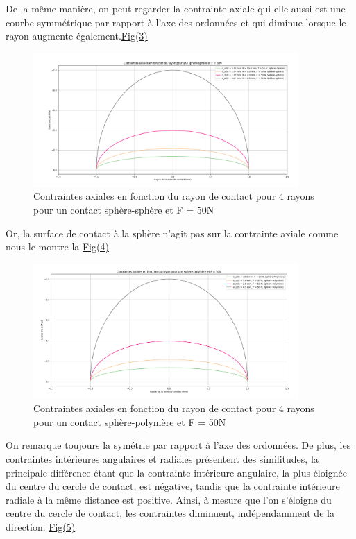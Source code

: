\documentclass[a4paper,12pt]{article}
\begin{document}
\clearpage
De la même manière, on peut regarder la contrainte axiale qui elle aussi est une courbe symmétrique par rapport à l'axe des ordonnées et qui diminue lorsque le rayon augmente également.\hyperref[fig:mon_image3]{Fig(3)}
\begin{figure}[H] %
	\centering
	\includegraphics[width=0.9\textwidth]{ax1.png} %
	\caption{Contraintes axiales en fonction du rayon de contact pour 4 rayons pour un contact sphère-sphère et F = 50N} %
	\label{fig:mon_image3} %
\end{figure}
Or, la surface de contact à la sphère n'agit pas sur la contrainte axiale comme nous le montre la \hyperref[fig:mon_image4]{Fig(4)}
\begin{figure}[H] %
	\centering
	\includegraphics[width=0.9\textwidth]{ax2.png} %
	\caption{Contraintes axiales en fonction du rayon de contact pour 4 rayons pour un contact sphère-polymère et F = 50N} %
	\label{fig:mon_image4} %
\end{figure}
\clearpage
On remarque toujours la symétrie par rapport à l'axe des ordonnées. De plus, les contraintes intérieures angulaires et radiales présentent des similitudes, la principale différence étant que la contrainte intérieure angulaire, la plus éloignée du centre du cercle de contact, est négative, tandis que la contrainte intérieure radiale à la même distance est positive. Ainsi, à mesure que l'on s'éloigne du centre du cercle de contact, les contraintes diminuent, indépendamment de la direction. \hyperref[fig:mon_image5]{Fig(5)}
\end{document}
